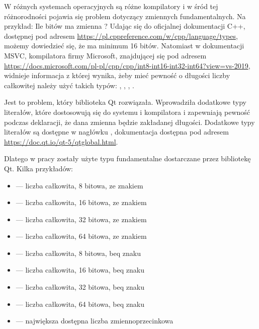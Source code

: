 \par
W różnych systemach operacyjnych są różne kompilatory i w śród tej różnorodności pojawia się problem dotyczący zmiennych fundamentalnych.
Na przykład: Ile bitów ma zmienna ?
Udając się do oficjalnej dokumentacji C++, dostępnej pod adresem \url{https://pl.cppreference.com/w/cpp/language/types}, możemy dowiedzieć się, że  ma minimum 16 bitów.
Natomiast w dokumentacji MSVC, kompilatora firmy Microsoft, znajdującej się pod adresem \url{https://docs.microsoft.com/pl-pl/cpp/cpp/int8-int16-int32-int64?view=vs-2019}, widnieje informacja z której wynika, żeby mieć pewność o długości liczby całkowitej należy użyć takich typów: , , , .
\par
Jest to problem, który biblioteka Qt rozwiązała.
Wprowadziła dodatkowe typy literałów, które dostosowują się do systemu i kompilatora i zapewniają pewność podczas deklaracji, że dana zmienna będzie zakładanej długości.
Dodatkowe typy literałów są dostępne w nagłówku , dokumentacja dostępna pod adresem \url{https://doc.qt.io/qt-5/qtglobal.html}.

\par
Dlatego w pracy zostały użyte typu fundamentalne dostarczane przez bibliotekę Qt.
Kilka przykładów:
\begin{itemize}
    \item {} --- liczba całkowita, 8 bitowa, ze znakiem
    \item {} --- liczba całkowita, 16 bitowa, ze znakiem
    \item {} --- liczba całkowita, 32 bitowa, ze znakiem
    \item {} --- liczba całkowita, 64 bitowa, ze znakiem
    \item {} --- liczba całkowita, 8 bitowa, beq znaku
    \item {} --- liczba całkowita, 16 bitowa, beq znaku
    \item {} --- liczba całkowita, 32 bitowa, beq znaku
    \item {} --- liczba całkowita, 64 bitowa, beq znaku
    \item {} --- największa dostępna liczba zmiennoprzecinkowa
\end{itemize}